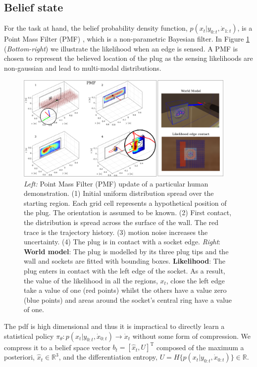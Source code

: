 \documentclass[final,3p,times,twocolumn]{elsarticle}
\begin{document}
\subsection{Belief state}

For the task at hand, the belief probability density function,  $p(x_t|y_{0:t},\dot{x}_{1:t})$,  
is a Point Mass Filter (PMF) \cite[p.87]{Bergman99recursivebayesian}, which is a non-parametric  Bayesian filter.
In Figure \ref{fig:PMF} (\textit{Bottom-right}) we illustrate the likelihood when an edge is sensed. 
A PMF is chosen to represent the believed location of the plug as the sensing likelihoods are non-gaussian and 
lead to multi-modal distributions. 

\begin{figure}
 \centering
   \includegraphics[width=0.95\textwidth]{./Figure/Figure2.pdf}
   \caption{\textit{Left:} Point Mass Filter (PMF) update of a particular human demonstration. (1) Initial uniform distribution spread over the starting 
   region. Each grid cell represents a hypothetical position of the plug. The orientation is assumed to be known. (2) First contact, the distribution 
   is spread across the surface of the wall. The red trace is the trajectory history. (3) motion noise increases the uncertainty. (4) The plug is in contact with a socket edge.
   \textit{Right}: \textbf{World model}: The plug is modelled by its three plug tips and the wall and sockets are fitted with bounding boxes.
   \textbf{Likelihood}: The plug enters in contact with the left edge of the socket. As a result, the value of the likelihood in all the regions, $x_t$, close the left edge take 
   a value of one (red points)  whilst the others have a value zero (blue points) and areas around the socket's central 
   ring have a value of one. }
  \label{fig:PMF}
\end{figure}

The pdf is high dimensional and thus it is impractical to directly learn a statistical 
policy ${\pi_{\theta} : p(x_t|y_{0:t},\dot{x}_{0:t}) \rightarrow \dot{x}_t}$ without some form of compression. 
We compress it to a belief space vector $b_t = [\hat{x}_t,U]^{\mathrm{T}}$ composed of the maximum a posteriori, 
$\hat{x}_t \in \mathbb{R}^3$, and the differentiation entropy, $U = H\{p(x_t|y_{0:t},\dot{x}_{0:t})\} \in \mathbb{R}$.
\end{document}
